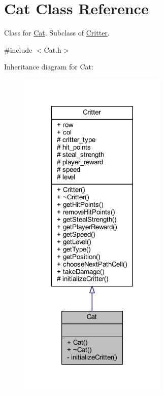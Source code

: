 \hypertarget{class_cat}{\section{Cat Class Reference}
\label{class_cat}
}


Class for \hyperlink{class_cat}{Cat}. Subclass of \hyperlink{class_critter}{Critter}.  




{\ttfamily \#include $<$Cat.\+h$>$}



Inheritance diagram for Cat\+:
\nopagebreak
\begin{figure}[H]
\begin{center}
\leavevmode
\includegraphics[width=200pt]{class_cat__inherit__graph}
\end{center}
\end{figure}


